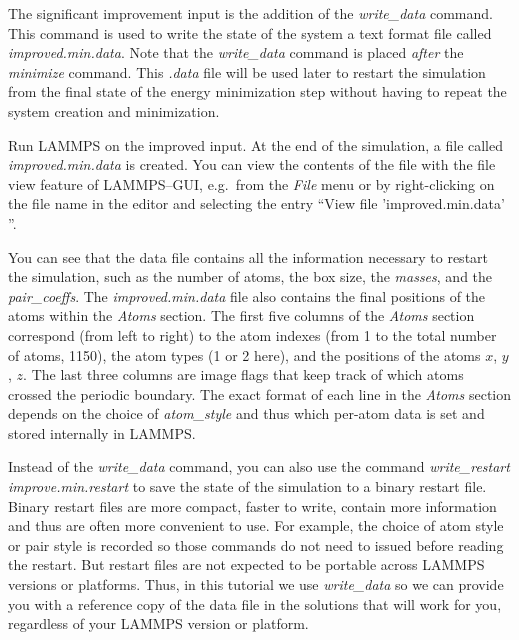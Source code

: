 \documentclass[9pt,tutorial]{livecoms}
\begin{document}
The significant improvement input is the addition of the
\textit{write\_data} command.  This command is used to write the state
of the system a text format file called \textit{improved.min.data}.
Note that the \textit{write\_data} command is placed \emph{after} the
\textit{minimize} command.  This \textit{.data} file will be used later
to restart the simulation from the final state of the energy
minimization step without having to repeat the system creation and
minimization.

Run LAMMPS on the improved input.  At the end of the simulation, a file
called \textit{improved.min.data} is created.  You can view the contents
of the file with the file view feature of LAMMPS--GUI, e.g.~from the
\textit{File} menu or by right-clicking on the file name in the editor
and selecting the entry ``View file 'improved.min.data' ''.

You can see that the data file contains all the information necessary to
restart the simulation, such as the number of atoms, the box size, the
\textit{masses}, and the \textit{pair\_coeffs}.  The
\textit{improved.min.data} file also contains the final
positions of the atoms within the \textit{Atoms} section. The first five
columns of the \textit{Atoms} section correspond (from left to right) to
the atom indexes (from 1 to the total number of atoms, 1150), the atom
types (1 or 2 here), and the positions of the atoms $x$, $y$, $z$. The
last three columns are image flags that keep track of which atoms
crossed the periodic boundary.  The exact format of each line in the
\textit{Atoms} section depends on the choice of \textit{atom\_style} and
thus which per-atom data is set and stored internally in LAMMPS.

\begin{note}
  Instead of the \textit{write\_data} command, you can also use the
  command \textit{write\_restart improve.min.restart} to save the state
  of the simulation to a binary restart file.  Binary restart files are
  more compact, faster to write, contain more information and thus are
  often more convenient to use.  For example, the choice of atom style
  or pair style is recorded so those commands do not need to issued
  before reading the restart.  But restart files are not expected to be
  portable across LAMMPS versions or platforms.  Thus, in this tutorial
  we use \textit{write\_data} so we can provide you with a reference
  copy of the data file in the solutions that will work for you,
  regardless of your LAMMPS version or platform.
\end{note}
\end{document}
